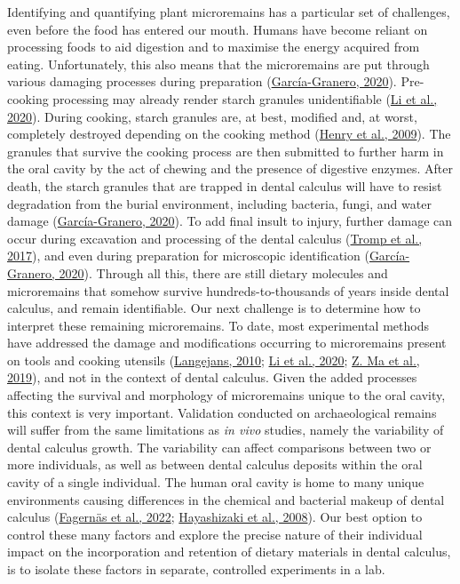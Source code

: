 \documentclass[
  b5paper,
]{book}
\begin{document}
Identifying and quantifying plant microremains has a particular set of
challenges, even before the food has entered our mouth. Humans have
become reliant on processing foods to aid digestion and to maximise the
energy acquired from eating. Unfortunately, this also means that the
microremains are put through various damaging processes during
preparation
(\protect\hyperlink{ref-graneroStarchTaphonomy2020}{García-Granero,
2020}). Pre-cooking processing may already render starch granules
unidentifiable (\protect\hyperlink{ref-liInfluenceGrinding2020}{Li et
al., 2020}). During cooking, starch granules are, at best, modified and,
at worst, completely destroyed depending on the cooking method
(\protect\hyperlink{ref-henryCookingStarch2009}{Henry et al., 2009}).
The granules that survive the cooking process are then submitted to
further harm in the oral cavity by the act of chewing and the presence
of digestive enzymes. After death, the starch granules that are trapped
in dental calculus will have to resist degradation from the burial
environment, including bacteria, fungi, and water damage
(\protect\hyperlink{ref-graneroStarchTaphonomy2020}{García-Granero,
2020}). To add final insult to injury, further damage can occur during
excavation and processing of the dental calculus
(\protect\hyperlink{ref-trompEDTACalculus2017}{Tromp et al., 2017}), and
even during preparation for microscopic identification
(\protect\hyperlink{ref-graneroStarchTaphonomy2020}{García-Granero,
2020}). Through all this, there are still dietary molecules and
microremains that somehow survive hundreds-to-thousands of years inside
dental calculus, and remain identifiable. Our next challenge is to
determine how to interpret these remaining microremains. To date, most
experimental methods have addressed the damage and modifications
occurring to microremains present on tools and cooking utensils
(\protect\hyperlink{ref-langejansRemainsDay2010}{Langejans, 2010};
\protect\hyperlink{ref-liInfluenceGrinding2020}{Li et al., 2020};
\protect\hyperlink{ref-maMorphologicalChanges2019}{Z. Ma et al., 2019}),
and not in the context of dental calculus. Given the added processes
affecting the survival and morphology of microremains unique to the oral
cavity, this context is very important. Validation conducted on
archaeological remains will suffer from the same limitations as \emph{in
vivo} studies, namely the variability of dental calculus growth. The
variability can affect comparisons between two or more individuals, as
well as between dental calculus deposits within the oral cavity of a
single individual. The human oral cavity is home to many unique
environments causing differences in the chemical and bacterial makeup of
dental calculus
(\protect\hyperlink{ref-fagernasMicrobialBiogeography2022}{Fagernäs et
al., 2022};
\protect\hyperlink{ref-hayashizakiSiteSpecific2008}{Hayashizaki et al.,
2008}). Our best option to control these many factors and explore the
precise nature of their individual impact on the incorporation and
retention of dietary materials in dental calculus, is to isolate these
factors in separate, controlled experiments in a lab.
\end{document}

